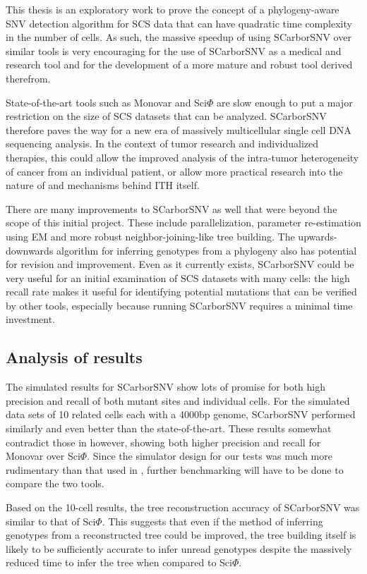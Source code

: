 \documentclass[../main.tex]{subfiles}
\begin{document}
This thesis is an exploratory work to prove the concept of a phylogeny-aware SNV detection algorithm for SCS data that can have quadratic time complexity in the number of cells.
As such, the massive speedup of using SCarborSNV over similar tools is very encouraging for the use of SCarborSNV as a medical and research tool and for the development of a more mature and robust tool derived therefrom.

State-of-the-art tools such as Monovar and Sci$\Phi$ are slow enough to put a major restriction on the size of SCS datasets that can be analyzed.
SCarborSNV therefore paves the way for a new era of massively multicellular single cell DNA sequencing analysis.
In the context of tumor research and individualized therapies, this could allow the improved analysis of the intra-tumor heterogeneity of cancer from an individual patient, or allow more practical research into the nature of and mechanisms behind ITH itself.

There are many improvements to SCarborSNV as well that were beyond the scope of this initial project.
These include parallelization, parameter re-estimation using EM and more robust neighbor-joining-like tree building.
The upwards-downwards algorithm for inferring genotypes from a phylogeny also has potential for revision and improvement.
Even as it currently exists, SCarborSNV could be very useful for an initial examination of SCS datasets with many cells: the high recall rate makes it useful for identifying potential mutations that can be verified by other tools, especially because running SCarborSNV requires a minimal time investment.

\subsection{Analysis of results}
The simulated results for SCarborSNV show lots of promise for both high precision and recall of both mutant sites and individual cells.
For the simulated data sets of 10 related cells each with a 4000bp genome, SCarborSNV performed similarly and even better than the state-of-the-art.
These results somewhat contradict those in \cite{sciphi} however, showing both higher precision and recall for Monovar over Sci$\Phi$.
Since the simulator design for our tests was much more rudimentary than that used in \cite{sciphi}, further benchmarking will have to be done to compare the two tools.

Based on the 10-cell results, the tree reconstruction accuracy of SCarborSNV was similar to that of Sci$\Phi$.
This suggests that even if the method of inferring genotypes from a reconstructed tree could be improved, the tree building itself is likely to be sufficiently accurate to infer unread genotypes despite the massively reduced time to infer the tree  when compared to Sci$\Phi$.
\end{document}
